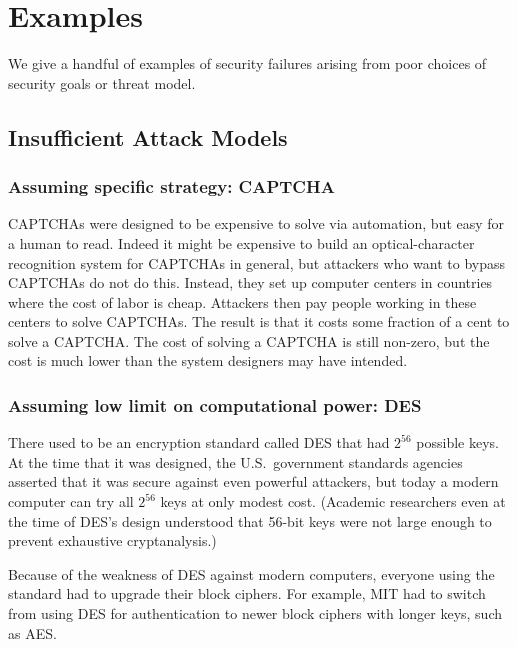 \section{Examples}

We give a handful of examples of security failures arising from poor
choices of security goals or threat model.

\subsection{Insufficient Attack Models}

\subsubsection{Assuming specific strategy: CAPTCHA}
CAPTCHAs were designed to be expensive to
solve via automation, but easy for a human to read.
Indeed it might be expensive to build an optical-character recognition 
system for CAPTCHAs in general, but attackers who want
to bypass CAPTCHAs do not do this.
Instead, they set up computer centers in countries where the cost of
labor is cheap. Attackers then pay people working in these 
centers to solve CAPTCHAs.\autocite{motoyama:recaptchas}
The result is that it costs some fraction of
a cent to solve a CAPTCHA. 
The cost of solving a CAPTCHA is still non-zero,
but the cost is much lower than the system designers
may have intended.

\subsubsection{Assuming low limit on computational power: DES}
There used to be an encryption standard called DES that had $2^{56}$ possible keys.
At the time that it was designed, the U.S.~government standards agencies asserted that it was
secure against even powerful attackers,
but today a modern computer can try all $2^{56}$ keys at only modest cost.
(Academic researchers even at the time of DES's
design understood that 56-bit keys were not large
enough to prevent exhaustive
cryptanalysis.\autocite{DH77})

Because of the weakness of DES against modern computers,
everyone using the standard had to upgrade their block ciphers.
For example, MIT had to switch from using DES for authentication 
to newer block ciphers with longer keys, such as AES.

